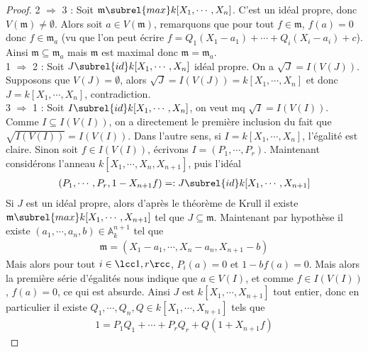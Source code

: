             \begin{proof}
                2 $\Rightarrow$ 3 : Soit $\mathfrak{m} \subrel{max} k[X_1, \cdots, X_n]$. C'est un idéal propre, donc $V(\mathfrak{m}) \neq \emptyset$. Alors soit $a \in V(\mathfrak{m})$, remarquons que pour tout $f \in \mathfrak{m}$, $f(a) = 0$ donc $f \in \mathfrak{m}_a$ (vu que l'on peut écrire $f = Q_1(X_1 - a_1) + \cdots + Q_i(X_i - a_i) + c$). Ainsi $\mathfrak{m} \subseteq \mathfrak{m}_a$ mais $\mathfrak{m}$ est maximal donc $\mathfrak{m} = \mathfrak{m}_a$.\\
                1 $\Rightarrow$ 2 : Soit $J \subrel{id} k[X_1, \cdots, X_n]$ idéal propre. On a $\sqrt{J} = I(V(J))$. Supposons que $V(J) = \emptyset$, alors $\sqrt{J} = I(V(J)) = k[X_1, \cdots, X_n]$ et donc $J = k[X_1, \cdots, X_n]$, contradiction.\\
                3 $\Rightarrow$ 1 : Soit $I \subrel{id} k[X_1, \cdots, X_n]$, on veut mq $\sqrt{I} = I(V(I))$. Comme $I \subseteq I(V(I))$, on a directement le première inclusion du fait que $\sqrt{I(V(I))} = I(V(I))$. Dans l'autre sens, si $I = k[X_1, \cdots, X_n]$, l'égalité est claire. Sinon soit $f \in I(V(I))$, écrivons $I = (P_1, \cdots, P_r)$. Maintenant considérons l'anneau $k[X_1, \cdots, X_n, X_{n+1}]$, puis l'idéal
                \begin{align*}
                    (P_1, \cdots, P_r, 1 - X_{n+1}f) =: J \subrel{id} k[X_1, \cdots, X_{n+1}]
                \end{align*}
                Si $J$ est un idéal propre, alors d'après le théorème de Krull il existe $\mathfrak{m} \subrel{max} k[X_1, \cdots, X_{n+1}]$ tel que $J \subseteq \mathfrak{m}$. Maintenant par hypothèse il existe $(a_1, \cdots, a_n, b) \in \mathbb{A}_k^{n+1}$ tel que
                \begin{align*}
                    \mathfrak{m} = (X_1 - a_1, \cdots, X_n - a_n, X_{n+1} - b)
                \end{align*}
                Mais alors pour tout $i \in \lcc 1,r \rcc$, $P_i(a) = 0$ et $1 - bf(a) = 0$. Mais alors la première série d'égalités nous indique que $a \in V(I)$, et comme $f \in I(V(I))$, $f(a) = 0$, ce qui est absurde. Ainsi $J$ est $k[X_1, \cdots, X_{n+1}]$ tout entier, donc en particulier il existe $Q_1, \cdots, Q_n, Q \in k[X_1, \cdots, X_{n+1}]$ tels que
                \begin{align}
                    \label{1.1}
                    1 = P_1Q_1 + \cdots + P_rQ_r + Q(1 + X_{n+1}f)
                \end{align}

\end{proof}
